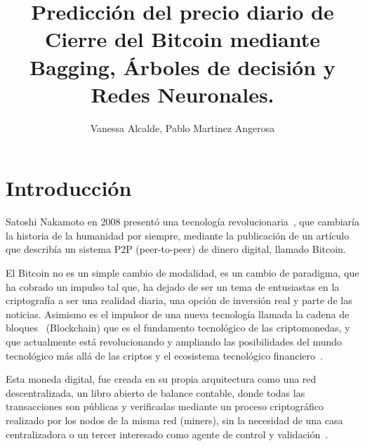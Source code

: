 \documentclass[a4paper,12pt,twocolumn]{article}
\date{ }
\title{\textbf{Predicción del precio diario de Cierre del Bitcoin mediante Bagging, Árboles de decisión y Redes Neuronales. }}
\author{Vanessa Alcalde, Pablo Martinez Angerosa}
\begin{document}
\setlength{\columnsep}{0.8cm}

\vspace{1.0cm}


\section{Introducción}
 Satoshi Nakamoto en 2008 presentó una tecnología revolucionaria~\cite{Satoshi}, que cambiaría la historia de la humanidad por siempre, mediante la publicación de un artículo que describía un sistema P2P (peer-to-peer) de dinero digital, llamado Bitcoin. 

El Bitcoin no es un simple cambio de modalidad, es un cambio de paradigma, que ha cobrado un impulso tal que, ha dejado de ser un tema de entusiastas en la criptografía a ser una realidad diaria, una opción de inversión real y parte de las noticias. Asimismo es el impulsor de una nueva tecnología llamada la cadena de bloques~\cite{Blockchain} (Blockchain) que es el fundamento tecnológico de las criptomonedas,  y que actualmente está revolucionando y ampliando las posibilidades del mundo tecnológico más allá de las criptos y el ecosistema tecnológico financiero~\cite{Bitcoin_revolucion_monetaria}. 

Esta moneda digital, fue creada en su propia arquitectura como una red descentralizada, un libro abierto de balance contable, donde todas las transacciones son públicas y verificadas mediante un proceso criptográfico realizado por los nodos de la misma red (miners), sin la necesidad de una casa centralizadora o un tercer interesado como agente de control y validación~\cite{Satoshi}. 
\end{document}
